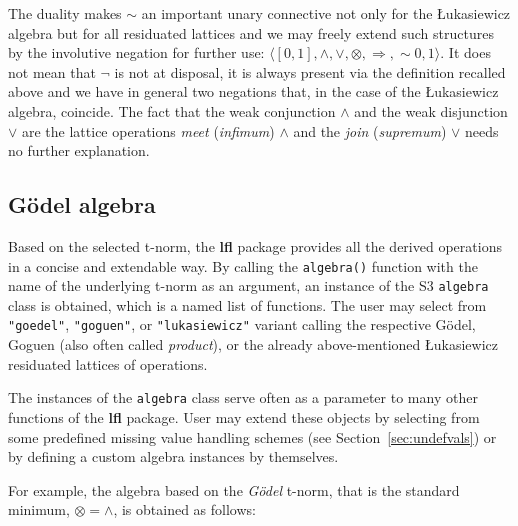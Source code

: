 \documentclass[review]{elsarticle}
\newcommand{\pkg}[1]{\textbf{#1}}
\newcommand{\code}[1]{\texttt{#1}}
\begin{document}
The duality makes $\sim$ an important unary connective not only for the \L ukasiewicz algebra but for all residuated lattices and we may freely extend such structures by the involutive negation for further use: $\langle [0,1], \wedge, \vee, \otimes , \Rightarrow, \sim 0 , 1 \rangle$. It does not mean that $\neg$ is not at disposal, it is always present via the definition recalled above and we have in general two negations that, in the case of the \L ukasiewicz algebra, coincide. The fact that the weak conjunction $\wedge$ and the weak disjunction $\vee$ are the lattice operations \emph{meet} (\emph{infimum})  $\land$ and the \emph{join} (\emph{supremum})  $\lor$ needs no further explanation.


\subsection{G\"odel algebra}
\label{sec:goedel}


Based on the selected t-norm, the \pkg{lfl} package provides all the derived operations in a concise and extendable way. By calling the \code{algebra()} function with the name of the underlying t-norm as an argument, an instance of the S3 \code{algebra} class is obtained, which is a named list of functions. The user may select from \code{"goedel"}, \code{"goguen"}, or \code{"lukasiewicz"} variant calling the respective G\"odel, Goguen (also often called \emph{product}), or the already above-mentioned \L ukasiewicz residuated lattices of operations. 

The instances of the \code{algebra} class serve often as a parameter to many other functions of the \pkg{lfl} package. User may extend these objects by selecting from some predefined missing value handling schemes (see Section~\ref{sec:undefvals}) or by defining a custom algebra instances by themselves.


For example, the algebra based on the \emph{G\"odel} t-norm, that is the standard minimum, $\otimes = \wedge$, is obtained as follows:
%

\end{document}
